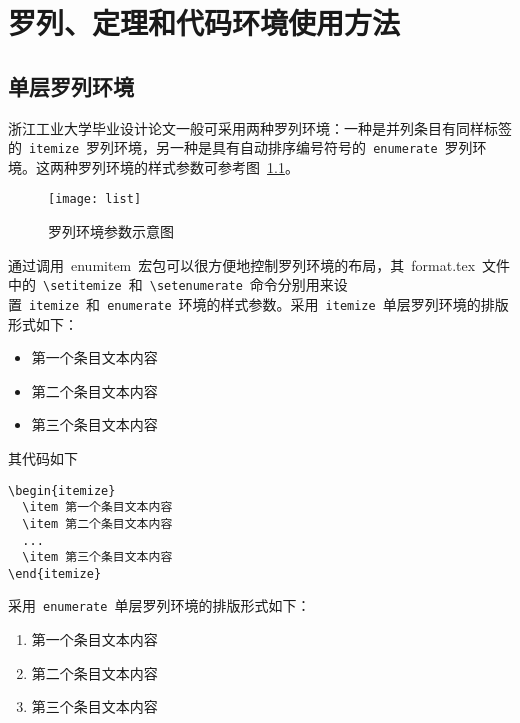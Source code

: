 
\chapter{罗列、定理和代码环境使用方法}

\section{单层罗列环境}

浙江工业大学毕业设计论文一般可采用两种罗列环境：一种是并列条目有同样标签的~\verb|itemize|~罗列环境，另一种是具有自动排序编号符号的~\verb|enumerate|~罗列环境。这两种罗列环境的样式参数可参考图~\ref{fig:list}。
\begin{figure}[htbp]
\centering
\texttt{[image: list]}
\caption{罗列环境参数示意图}\label{fig:list}\vspace{-1em}
\end{figure}

通过调用~enumitem~宏包可以很方便地控制罗列环境的布局，其~format.tex~文件中的~\verb|\setitemize|~和~\verb|\setenumerate|~命令分别用来设置~\verb|itemize|~和~\verb|enumerate|~环境的样式参数。采用~\verb|itemize|~单层罗列环境的排版形式如下：

\begin{itemize}
\item 第一个条目文本内容
\item 第二个条目文本内容
\item 第三个条目文本内容
\end{itemize}

其代码如下

\begin{verbatim}
\begin{itemize}
  \item 第一个条目文本内容
  \item 第二个条目文本内容
  ...
  \item 第三个条目文本内容
\end{itemize}
\end{verbatim}

采用~\verb|enumerate|~单层罗列环境的排版形式如下：

\begin{enumerate}
\item 第一个条目文本内容
\item 第二个条目文本内容
\item 第三个条目文本内容
\end{enumerate}

